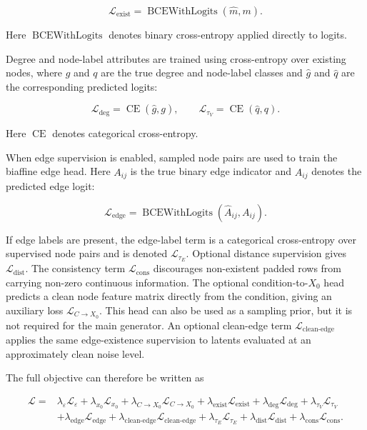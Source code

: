 \[
    \mathcal{L}_{\mathrm{exist}}
    =
    \operatorname{BCEWithLogits}(\hat{m}, m).
\]

Here \(\operatorname{BCEWithLogits}\) denotes binary cross-entropy applied
directly to logits.

Degree and node-label attributes are trained using cross-entropy over existing
nodes, where \(g\) and \(q\) are the true degree and node-label classes and
\(\hat g\) and \(\hat q\) are the corresponding predicted logits:

\[
    \mathcal{L}_{\mathrm{deg}}
    =
    \operatorname{CE}(\hat{g}, g),
    \qquad
    \mathcal{L}_{\tau_V}
    =
    \operatorname{CE}(\hat{q}, q).
\]

Here \(\operatorname{CE}\) denotes categorical cross-entropy.

When edge supervision is enabled, sampled node pairs are used to train the
biaffine edge head. Here \(A_{ij}\) is the true binary edge indicator and
\(\hat A_{ij}\) denotes the predicted edge logit:

\[
    \mathcal{L}_{\mathrm{edge}}
    =
    \operatorname{BCEWithLogits}(\hat{A}_{ij}, A_{ij}).
\]

If edge labels are present, the edge-label term is a categorical
cross-entropy over supervised node pairs and is denoted
\(\mathcal{L}_{\tau_E}\). Optional distance supervision gives
\(\mathcal{L}_{\mathrm{dist}}\). The consistency term
\(\mathcal{L}_{\mathrm{cons}}\) discourages non-existent padded rows from
carrying non-zero continuous information. The optional condition-to-\(X_0\)
head predicts a clean node feature matrix directly from the condition, giving
an auxiliary loss \(\mathcal{L}_{C\rightarrow X_0}\). This head can also be used
as a sampling prior, but it is not required for the main generator. An optional
clean-edge term \(\mathcal{L}_{\mathrm{clean\text{-}edge}}\) applies the same
edge-existence supervision to latents evaluated at an approximately clean noise
level.

The full objective can therefore be written as

\[
\begin{aligned}
    \mathcal{L}
    ={}&
    \lambda_{\varepsilon}\mathcal{L}_{\varepsilon}
    + \lambda_{x_0}\mathcal{L}_{x_0}
    + \lambda_{C\rightarrow X_0}\mathcal{L}_{C\rightarrow X_0}
    + \lambda_{\mathrm{exist}}\mathcal{L}_{\mathrm{exist}}
    + \lambda_{\mathrm{deg}}\mathcal{L}_{\mathrm{deg}}
    + \lambda_{\tau_V}\mathcal{L}_{\tau_V}  \\
    &+
    \lambda_{\mathrm{edge}}\mathcal{L}_{\mathrm{edge}}
    + \lambda_{\mathrm{clean\text{-}edge}}\mathcal{L}_{\mathrm{clean\text{-}edge}}
    + \lambda_{\tau_E}\mathcal{L}_{\tau_E}
    + \lambda_{\mathrm{dist}}\mathcal{L}_{\mathrm{dist}}
    + \lambda_{\mathrm{cons}}\mathcal{L}_{\mathrm{cons}}.
\end{aligned}
\]

